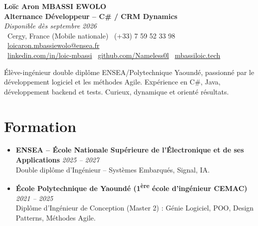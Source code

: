 \documentclass[a4paper,11pt]{article}
\begin{document}
\begin{center}
    {\Large \textbf{Loïc Aron MBASSI EWOLO}} \\ \vspace{4pt}
    \textbf{\large Alternance Développeur -- C\# / CRM Dynamics} \\
    \textit{\small Disponible dès septembre 2026} \\ \vspace{4pt}
    \small
    \faMapMarker\ Cergy, France (Mobile nationale) \quad
    \faPhone\ (+33) 7 59 52 33 98 \quad
    \faEnvelope\ \href{mailto:loicaron.mbassiewolo@ensea.fr}{loicaron.mbassiewolo@ensea.fr} \\ \vspace{2pt}
    \faLinkedin\ \href{https://www.linkedin.com/in/loic-mbassi/}{linkedin.com/in/loic-mbassi} \quad
    \faGithub\ \href{https://github.com/Nameless0l}{github.com/Nameless0l} \quad
    \faGlobe\ \href{https://mbassiloic.tech}{mbassiloic.tech}
\end{center}

\vspace{-6pt}

\noindent\small{Élève-ingénieur double diplôme ENSEA/Polytechnique Yaoundé, passionné par le développement logiciel et les méthodes Agile. Expérience en C\#, Java, développement backend et tests. Curieux, dynamique et orienté résultats.}

\section{Formation}
\begin{itemize}[leftmargin=*, label=\tiny$\bullet$, nosep]
    \item \textbf{ENSEA -- École Nationale Supérieure de l'Électronique et de ses Applications} \hfill \textit{2025 -- 2027} \\
    \small{Double diplôme d'Ingénieur -- Systèmes Embarqués, Signal, IA.}
    \item \textbf{École Polytechnique de Yaoundé (1\textsuperscript{ère} école d'ingénieur CEMAC)} \hfill \textit{2021 -- 2025} \\
    \small{Diplôme d'Ingénieur de Conception (Master 2) : Génie Logiciel, POO, Design Patterns, Méthodes Agile.}
\end{itemize}

\end{document}
